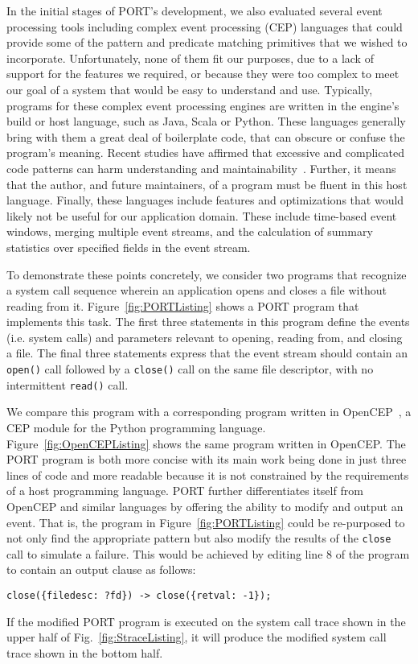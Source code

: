 In the initial stages of PORT's development, we also
evaluated several event processing tools
including
complex event processing (CEP) languages that
could
provide some of the pattern and predicate matching primitives
that we wished to
incorporate.
Unfortunately,
none of them fit our purposes,
due to a lack of
support for the features
we required,
or because they were too complex
to meet our
goal of a system
that would be easy to understand and use.
Typically,
programs for these complex event processing engines are
written in the engine's build or host language,
such as Java,
Scala or
Python.
These languages generally bring with them a great deal of boilerplate code,
that can obscure or confuse
the program's meaning.
Recent studies
have affirmed that excessive and complicated code
patterns can harm
understanding and
maintainability~\cite{misunderstandings}.
Further,
it means that the author,
and future maintainers,
of a
program must be fluent in this host language.
Finally,
these languages include features and optimizations
that would likely not be useful for our application domain.
These include time-based event windows,
merging multiple event streams,
and the calculation of
summary statistics over specified fields in the event stream.


To demonstrate these points concretely,
we consider two programs that recognize a system call sequence wherein an
application opens and closes a file
without reading from it.
Figure~\ref{fig:PORTListing} shows a PORT program that implements this
task.  The first three statements in this program define the events (i.e.
system calls) and parameters relevant to opening, reading from, and closing
a file.  The final three statements express that the event stream
should contain an \texttt{open()} call followed by a \texttt{close()} call on the same file descriptor, with no intermittent \texttt{read()} call.

We compare this program
with a corresponding program written in OpenCEP~\cite{open_cep_website},
a CEP module for the Python programming language.
Figure~\ref{fig:OpenCEPListing} shows the same program written in
OpenCEP.
The PORT program is both more concise with its main work being done in just
three lines of code and more readable because it is not constrained by the
requirements of a host programming language.
PORT further differentiates itself from OpenCEP and similar languages by
offering the ability to modify and output an event.
That is, the program in Figure~\ref{fig:PORTListing} could be
re-purposed to not only find the appropriate pattern but also modify the
results of the {\tt close} call to simulate a failure.
This would be achieved
by editing line 8 of the program to contain an output
clause as follows:
\begin{lstlisting}[numbers=none,xleftmargin=0em,gobble=2,columns=strict]
  close({filedesc: ?fd}) -> close({retval: -1});
\end{lstlisting}
If the modified PORT program is executed on the system call trace shown in the upper half of Fig.~\ref{fig:StraceListing}, it will produce the modified system call trace shown in the bottom half.

